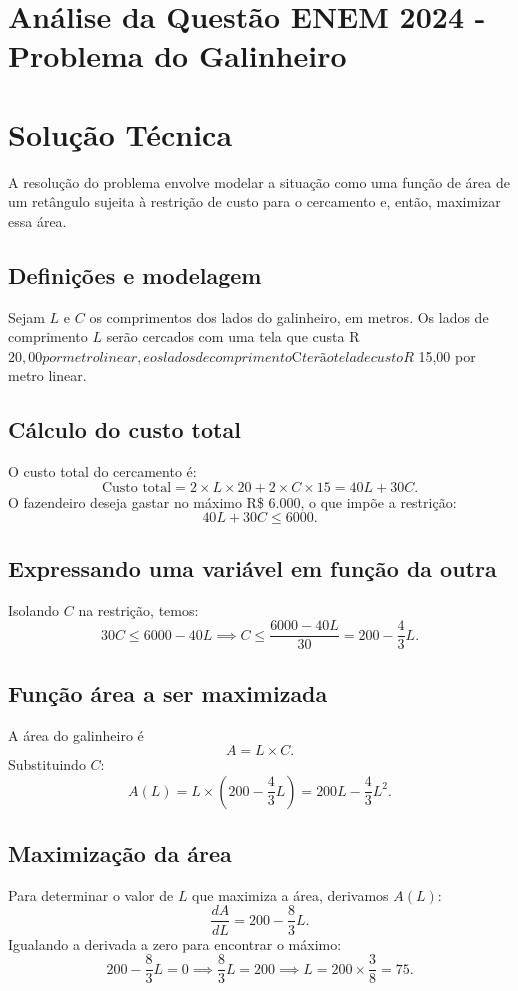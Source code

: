 \documentclass{article}
\begin{document}
\section*{Análise da Questão ENEM 2024 - Problema do Galinheiro}

\section{Solução Técnica}
A resolução do problema envolve modelar a situação como uma função de área de um retângulo sujeita à restrição de custo para o cercamento e, então, maximizar essa área.

\subsection{Definições e modelagem}
Sejam $L$ e $C$ os comprimentos dos lados do galinheiro, em metros. Os lados de comprimento $L$ serão cercados com uma tela que custa R$ 20,00 por metro linear, e os lados de comprimento $C$ terão tela de custo R$ 15,00 por metro linear.

\subsection{Cálculo do custo total}
O custo total do cercamento é:
\[
\text{Custo total} = 2 \times L \times 20 + 2 \times C \times 15 = 40L + 30C.
\]
O fazendeiro deseja gastar no máximo R\$ 6.000, o que impõe a restrição:
\[
40L + 30C \leq 6000.
\]

\subsection{Expressando uma variável em função da outra}
Isolando $C$ na restrição, temos:
\[
30C \leq 6000 - 40L \implies C \leq \frac{6000 - 40L}{30} = 200 - \frac{4}{3} L.
\]

\subsection{Função área a ser maximizada}
A área do galinheiro é 
\[
A = L \times C.
\]
Substituindo $C$:
\[
A(L) = L \times \left(200 - \frac{4}{3} L \right) = 200L - \frac{4}{3} L^{2}.
\]

\subsection{Maximização da área}
Para determinar o valor de $L$ que maximiza a área, derivamos $A(L)$:
\[
\frac{dA}{dL} = 200 - \frac{8}{3}L.
\]
Igualando a derivada a zero para encontrar o máximo:
\[
200 - \frac{8}{3}L = 0 \implies \frac{8}{3}L = 200 \implies L = 200 \times \frac{3}{8} = 75.
\]
\end{document}
